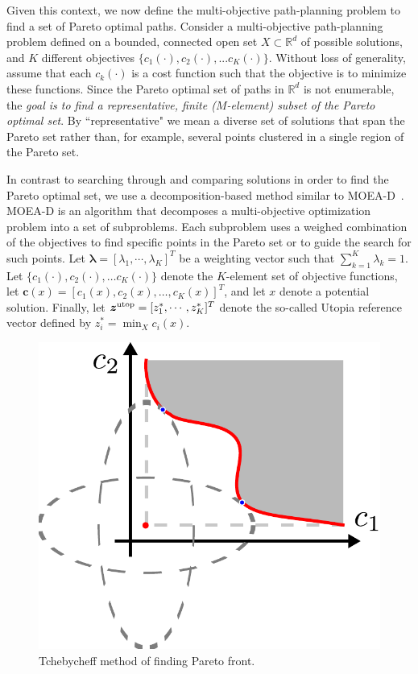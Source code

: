 \documentclass[phd]{byuprop}
\begin{document}
Given this context, we now define the multi-objective path-planning problem to find a set of Pareto optimal paths.
Consider a multi-objective path-planning problem defined on a bounded, connected open set $X\subset\mathbb{R}^d$ of possible solutions, and $K$ different objectives $\{c_{1}(\cdot), c_{2}(\cdot), ... c_{K}(\cdot)\}$. 
Without loss of generality, assume that each $c_{k}(\cdot)$ is a cost function such that the objective is to minimize these functions.  
Since the Pareto optimal set of paths in $ \mathbb{R}^{d} $ is not enumerable, the {\em goal is to find a representative, finite ($M$-element) subset of the Pareto optimal set}.  
By ``representative" we mean a diverse set of solutions that span the Pareto set rather than, for example, several points clustered in a single region of the Pareto set.

In contrast to searching through and comparing solutions in order to find the Pareto optimal set, we use a decomposition-based method similar to MOEA-D~\cite{Zhang2007}.  
MOEA-D is an algorithm that decomposes a multi-objective optimization problem into a set of subproblems.  
Each subproblem uses a weighed combination of the objectives to find specific points in the Pareto set or to guide the search for such points.  
Let $ \bm{\lambda} = [ \lambda_{1} , \cdots , \lambda_{K}  ]^{T} $ be a weighting vector such that $ \sum_{k=1}^{K} \lambda_{k} = 1 $.  
Let $\{c_{1}(\cdot), c_{2}(\cdot), \ldots c_{K}(\cdot)\}$ denote the $K$-element set of objective functions, let $\bm{c}(x) = [c_{1}(x), c_{2}(x), \ldots, c_{K}(x)]^T$, and let $x$ denote a potential solution.  
Finally, let $ \bm{z}^{\rm utop} = [z^{*}_{1}, \cdots , z^{*}_{K}]^{T} $ denote the so-called Utopia reference vector defined by $  z^{*}_{i} = \min_{ X } c_{i} (x) $. 

\begin{figure}
	\centering
	\includegraphics[width=0.3\linewidth]{fig/Tchebycheff}
	\caption{Tchebycheff method of finding Pareto front.}
	\label{fig:Tchebycheff}
\end{figure}
\end{document}

